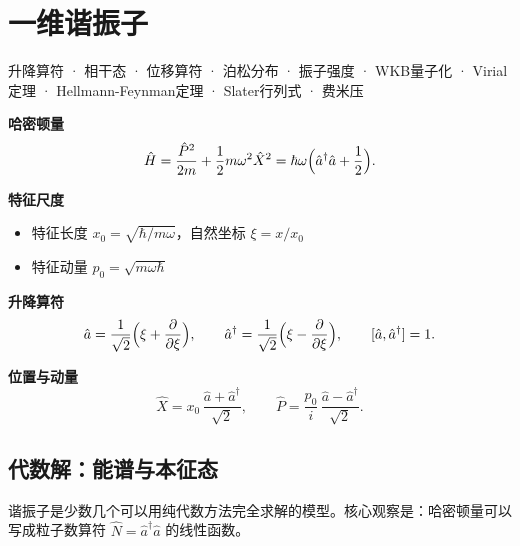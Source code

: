 \section{一维谐振子}
\label{sec:model-ho-1d}

\begin{tipbox}[关键词]
升降算符 · 相干态 · 位移算符 · 泊松分布 · 振子强度 · WKB量子化 ·
Virial定理 · Hellmann-Feynman定理 · Slater行列式 · 费米压
\end{tipbox}

\begin{modelbox}[模型：一维量子谐振子]
\textbf{哈密顿量}
\[
\hat{H} = \frac{\hat{P}^2}{2m} + \frac{1}{2}m\omega^2 \hat{X}^2
= \hbar\omega\Bigl(\hat{a}^\dagger \hat{a} + \frac{1}{2}\Bigr).
\]

\textbf{特征尺度}
\begin{itemize}[nosep]
    \item 特征长度 $x_0 = \sqrt{\hbar/m\omega}$，自然坐标 $\xi = x/x_0$
    \item 特征动量 $p_0 = \sqrt{m\omega\hbar}$
\end{itemize}

\textbf{升降算符}
\[
\hat{a} = \frac{1}{\sqrt{2}}\Bigl(\xi + \frac{\partial}{\partial\xi}\Bigr),
\qquad
\hat{a}^\dagger = \frac{1}{\sqrt{2}}\Bigl(\xi - \frac{\partial}{\partial\xi}\Bigr),
\qquad [\hat{a}, \hat{a}^\dagger] = 1.
\]

\textbf{位置与动量}
\[
\hat{X} = x_0\,\frac{\hat{a} + \hat{a}^\dagger}{\sqrt{2}},
\qquad
\hat{P} = \frac{p_0}{i}\,\frac{\hat{a} - \hat{a}^\dagger}{\sqrt{2}}.
\]
\end{modelbox}

\subsection{代数解：能谱与本征态}

谐振子是少数几个可以用纯代数方法完全求解的模型。核心观察是：哈密顿量可以写成粒子数算符 $\hat{N}=\hat{a}^\dagger\hat{a}$ 的线性函数。

